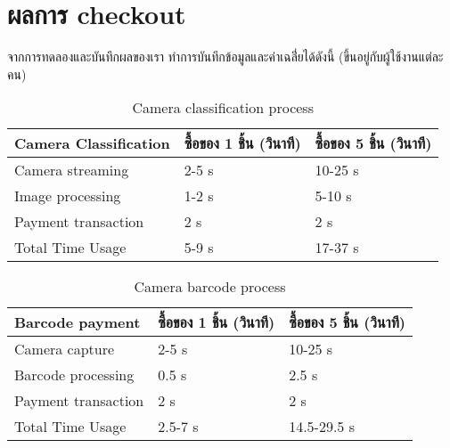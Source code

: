 \section{ผลการ checkout}
จากการทดลองและบันทึกผลของเรา ทำการบันทึกข้อมูลและค่าเฉลี่่ยได้ดังนี้
(ขึ้นอยู่กับผู้ใช้งานแต่ละคน)
\begin{table}[]
    \centering
    \caption{Camera classification process}
    \begin{tabular}{|p{5cm}|p{4cm}|p{4cm}|}
        \hline
        \textbf{Camera Classification} & \textbf{ซื้อของ 1 ชิ้น (วินาที)} & \textbf{ซื้อของ 5 ชิ้น (วินาที)} \\
        \hline
        Camera streaming               & 2-5 s                      & 10-25 s                    \\
        Image processing               & 1-2 s                      & 5-10 s                     \\
        Payment transaction            & 2 s                        & 2 s                        \\
        \hline
        Total Time Usage               & 5-9 s                      & 17-37 s                    \\
        \hline
    \end{tabular}
\end{table}


\begin{table}[]
    \centering
    \caption{Camera barcode process}
    \begin{tabular}{|p{5cm}|p{4cm}|p{4cm}|}
        \hline
        \textbf{Barcode payment} & \textbf{ซื้อของ 1 ชิ้น (วินาที)} & \textbf{ซื้อของ 5 ชิ้น (วินาที)} \\
        \hline
        Camera capture           & 2-5 s                      & 10-25 s                    \\
        Barcode processing       & 0.5 s                      & 2.5 s                      \\
        Payment transaction      & 2 s                        & 2 s                        \\
        \hline
        Total Time Usage         & 2.5-7 s                    & 14.5-29.5 s                \\
        \hline
    \end{tabular}
\end{table}


